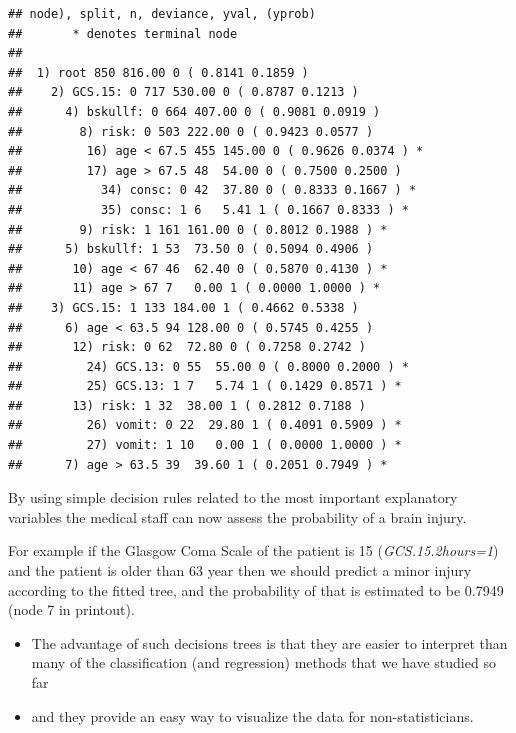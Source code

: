 \documentclass[ignorenonframetext,]{beamer}
\providecommand{\tightlist}{%
  \setlength{\itemsep}{0pt}\setlength{\parskip}{0pt}}
\begin{document}
\begin{frame}[fragile]

\footnotesize

\begin{verbatim}
## node), split, n, deviance, yval, (yprob)
##       * denotes terminal node
## 
##  1) root 850 816.00 0 ( 0.8141 0.1859 )  
##    2) GCS.15: 0 717 530.00 0 ( 0.8787 0.1213 )  
##      4) bskullf: 0 664 407.00 0 ( 0.9081 0.0919 )  
##        8) risk: 0 503 222.00 0 ( 0.9423 0.0577 )  
##         16) age < 67.5 455 145.00 0 ( 0.9626 0.0374 ) *
##         17) age > 67.5 48  54.00 0 ( 0.7500 0.2500 )  
##           34) consc: 0 42  37.80 0 ( 0.8333 0.1667 ) *
##           35) consc: 1 6   5.41 1 ( 0.1667 0.8333 ) *
##        9) risk: 1 161 161.00 0 ( 0.8012 0.1988 ) *
##      5) bskullf: 1 53  73.50 0 ( 0.5094 0.4906 )  
##       10) age < 67 46  62.40 0 ( 0.5870 0.4130 ) *
##       11) age > 67 7   0.00 1 ( 0.0000 1.0000 ) *
##    3) GCS.15: 1 133 184.00 1 ( 0.4662 0.5338 )  
##      6) age < 63.5 94 128.00 0 ( 0.5745 0.4255 )  
##       12) risk: 0 62  72.80 0 ( 0.7258 0.2742 )  
##         24) GCS.13: 0 55  55.00 0 ( 0.8000 0.2000 ) *
##         25) GCS.13: 1 7   5.74 1 ( 0.1429 0.8571 ) *
##       13) risk: 1 32  38.00 1 ( 0.2812 0.7188 )  
##         26) vomit: 0 22  29.80 1 ( 0.4091 0.5909 ) *
##         27) vomit: 1 10   0.00 1 ( 0.0000 1.0000 ) *
##      7) age > 63.5 39  39.60 1 ( 0.2051 0.7949 ) *
\end{verbatim}

\normalsize

\end{frame}

\begin{frame}

By using simple decision rules related to the most important explanatory
variables the medical staff can now assess the probability of a brain
injury.

For example if the Glasgow Coma Scale of the patient is 15
(\emph{GCS.15.2hours=1}) and the patient is older than 63 year then we
should predict a minor injury according to the fitted tree, and the
probability of that is estimated to be 0.7949 (node 7 in printout).

\begin{itemize}
\tightlist
\item
  The advantage of such decisions trees is that they are easier to
  interpret than many of the classification (and regression) methods
  that we have studied so far
\item
  and they provide an easy way to visualize the data for
  non-statisticians.
\end{itemize}

\end{frame}
\end{document}
